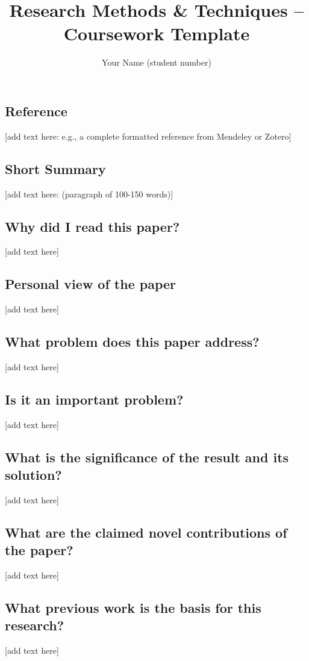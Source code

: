 \documentclass[11pt,a4paper]{article}
\title{Research Methods \& Techniques -- Coursework Template}
\author{Your Name (student number)}
\begin{document}
\maketitle

\subsection*{Reference}
[add text here: e.g., a complete formatted reference from Mendeley or Zotero]

\subsection*{Short Summary} 
[add text here: (paragraph of 100-150 words)]

\subsection*{Why did I read this paper?}
[add text here]

\subsection*{Personal view of the paper}
[add text here]

\subsection*{What problem does this paper address?}
[add text here]

\subsection*{Is it an important problem?}
[add text here]

\subsection*{What is the significance of the result and its solution?}
[add text here]

\subsection*{What are the claimed novel contributions of the paper?}
[add text here]

\subsection*{What previous work is the basis for this research?}
[add text here]
\end{document}
